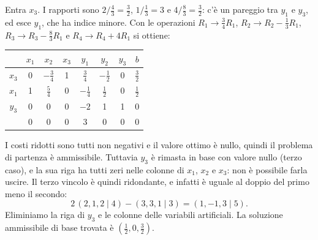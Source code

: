 Entra $x_3$. I rapporti sono $2/\frac43 = \frac32$, $1/\frac13 = 3$ e $4/\frac83 = \frac32$: c'è un pareggio tra $y_1$ e $y_3$, ed esce $y_1$, che ha indice minore. Con le operazioni $R_1 \to \frac34 R_1$, $R_2 \to R_2 - \frac13 R_1$, $R_3 \to R_3 - \frac83 R_1$ e $R_4 \to R_4 + 4R_1$ si ottiene:
\begin{center}
\begin{tabular}{c|cccccc|c}
 & $x_1$ & $x_2$ & $x_3$ & $y_1$ & $y_2$ & $y_3$ & $b$ \\
\hline
$x_3$ & 0 & $-\frac34$ & 1 & $\frac34$ & $-\frac12$ & 0 & $\frac32$ \\
$x_1$ & 1 & $\frac54$ & 0 & $-\frac14$ & $\frac12$ & 0 & $\frac12$ \\
$y_3$ & 0 & 0 & 0 & $-2$ & 1 & 1 & 0 \\
\hline
 & 0 & 0 & 0 & 3 & 0 & 0 & 0 \\
\end{tabular}
\end{center}
I costi ridotti sono tutti non negativi e il valore ottimo è nullo, quindi il problema di partenza è ammissibile. Tuttavia $y_3$ è rimasta in base con valore nullo (terzo caso), e la sua riga ha tutti zeri nelle colonne di $x_1$, $x_2$ e $x_3$: non è possibile farla uscire. Il terzo vincolo è quindi ridondante, e infatti è uguale al doppio del primo meno il secondo:
\[
2\,(2, 1, 2 \mid 4) - (3, 3, 1 \mid 3) = (1, -1, 3 \mid 5).
\]
Eliminiamo la riga di $y_3$ e le colonne delle variabili artificiali. La soluzione ammissibile di base trovata è $(\frac12, 0, \frac32)$.

